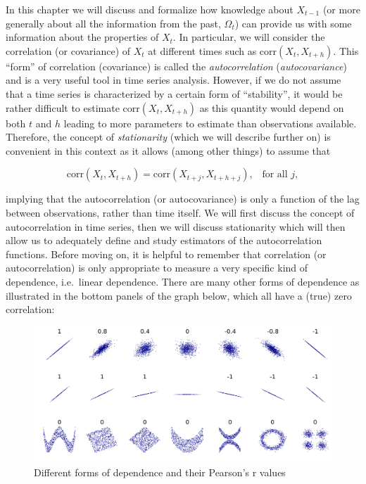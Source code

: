 \documentclass[]{book}
\theoremstyle{definition}
\theoremstyle{definition}
\theoremstyle{definition}
\theoremstyle{remark}
\begin{document}
In this chapter we will discuss and formalize how knowledge about
\(X_{t-1}\) (or more generally about all the information from the past,
\(\Omega_t\)) can provide us with some information about the properties
of \(X_t\). In particular, we will consider the correlation (or
covariance) of \(X_t\) at different times such as
\(\text{corr} \left(X_t, X_{t+h}\right)\). This ``form'' of correlation
(covariance) is called the \emph{autocorrelation}
(\emph{autocovariance}) and is a very useful tool in time series
analysis. However, if we do not assume that a time series is
characterized by a certain form of ``stability'', it would be rather
difficult to estimate \(\text{corr} \left(X_t, X_{t+h}\right)\) as this
quantity would depend on both \(t\) and \(h\) leading to more parameters
to estimate than observations available. Therefore, the concept of
\emph{stationarity} (which we will describe further on) is convenient in
this context as it allows (among other things) to assume that

\[\text{corr} \left(X_t, X_{t+h}\right) = \text{corr} \left(X_{t+j}, X_{t+h+j}\right), \;\;\; \text{for all $j$},\]

implying that the autocorrelation (or autocovariance) is only a function
of the lag between observations, rather than time itself. We will first
discuss the concept of autocorrelation in time series, then we will
discuss stationarity which will then allow us to adequately define and
study estimators of the autocorrelation functions. Before moving on, it
is helpful to remember that correlation (or autocorrelation) is only
appropriate to measure a very specific kind of dependence, i.e.~linear
dependence. There are many other forms of dependence as illustrated in
the bottom panels of the graph below, which all have a (true) zero
correlation:

\begin{figure}

{\centering \includegraphics[width=17.78in]{images/corr_example} 

}

\caption{Different forms of dependence and their Pearson's r values}\label{fig:correxample}
\end{figure}
\end{document}
